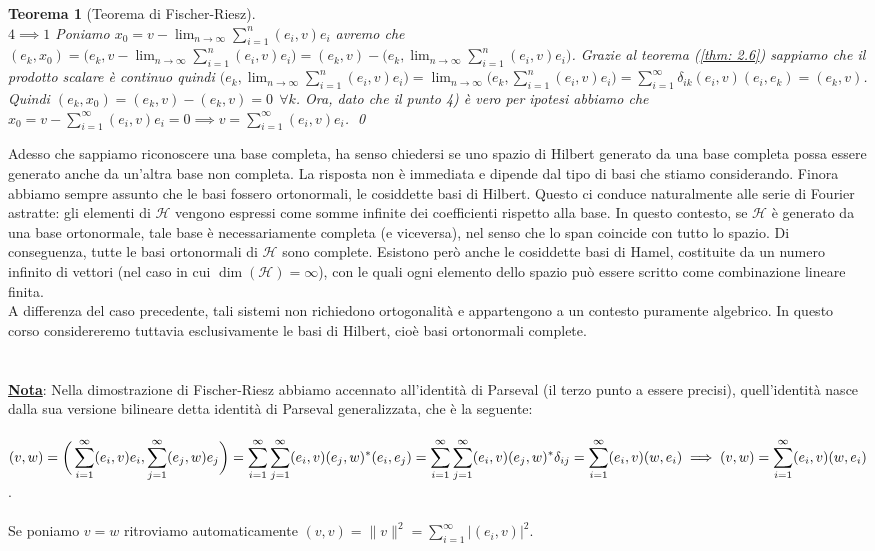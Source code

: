 \documentclass[a4paper,12pt]{report}
\newtheorem{teorema}{Teorema}[chapter]
\begin{document}
\begin{teorema}[Teorema di Fischer-Riesz]
    \\ $\boxed{4 \implies 1}$ Poniamo $x_0=v-\displaystyle\lim_{n \to\infty}\sum_{i=1}^n(e_i,v)e_i$ avremo che $(e_k,x_0)=\bigg(e_k, v-\displaystyle\lim_{n \to\infty}\sum_{i=1}^n(e_i,v)e_i\bigg)=(e_k,v)-\bigg(e_k,\lim_{n\to\infty}\sum_{i=1}^n(e_i,v)e_i\bigg)$. Grazie al teorema (\ref{thm: 2.6}) sappiamo che il prodotto scalare è continuo quindi \mbox{$\bigg(e_k, \displaystyle\lim_{n\to \infty}\sum_{i=1}^n(e_i,v)e_i\bigg)=\lim_{n\to \infty}\bigg(e_k,\sum_{i=1}^n(e_i,v)e_i\bigg)=\sum_{i=1}^{\infty}\delta_{ik}(e_i,v)(e_i,e_k)=(e_k,v)$}.
    \\Quindi $(e_k,x_0)=(e_k,v)-(e_k,v)=0 \ \ \forall k$. Ora, dato che il punto 4) è vero per ipotesi abbiamo che $x_0=v-\displaystyle\sum_{i=1}^{\infty}(e_i,v)e_i=0 \implies v=\sum_{i=1}^{\infty}(e_i,v)e_i$. \qed
\end{teorema}

Adesso che sappiamo riconoscere una base completa, ha senso chiedersi se uno spazio di Hilbert generato da una base completa possa essere generato anche da un’altra base non completa. La risposta non è immediata e dipende dal tipo di basi che stiamo considerando. Finora abbiamo sempre assunto che le basi fossero ortonormali, le cosiddette basi di Hilbert. Questo ci conduce naturalmente alle serie di Fourier astratte: gli elementi di $\mathscr{H}$ vengono espressi come somme infinite dei coefficienti rispetto alla base. In questo contesto, se $\mathscr{H}$ è generato da una base ortonormale, tale base è necessariamente completa (e viceversa), nel senso che lo span coincide con tutto lo spazio. Di conseguenza, tutte le basi ortonormali di $\mathscr{H}$ sono complete. Esistono però anche le cosiddette basi di Hamel, costituite da un numero infinito di vettori (nel caso in cui $\dim(\mathscr{H}) = \infty$), con le quali ogni elemento dello spazio può essere scritto come combinazione lineare finita.
\\A differenza del caso precedente, tali sistemi non richiedono ortogonalità e appartengono a un contesto puramente algebrico. In questo corso  considereremo tuttavia esclusivamente le basi di Hilbert, cioè basi ortonormali complete.
\\
\\
\\ \underline{\textbf{Nota}}\label{2.2.3,n}: Nella dimostrazione di Fischer-Riesz abbiamo accennato all'identità di Parseval (il terzo punto a essere precisi), quell'identità nasce dalla sua versione bilineare detta identità di Parseval generalizzata, che è la seguente:
\\
\\$(v,w)=\bigg(\displaystyle\sum_{i=1}^{\infty}(e_i,v)e_i, \sum_{j=1}^{\infty}(e_j,w)e_j\bigg)=\sum_{i=1}^{\infty}\sum_{j=1}^{\infty}(e_i,v)(e_j,w)^*(e_i,e_j)
=\sum_{i=1}^{\infty}\sum_{j=1}^{\infty}(e_i,v)(e_j,w)^*\delta_{ij}
\\=\sum_{i=1}^{\infty}(e_i,v)(w,e_i) \implies (v,w)=\sum_{i=1}^{\infty}(e_i,v)(w,e_i)$.
\\
\\ Se poniamo $v=w$ ritroviamo automaticamente $(v,v)=\|v\|^2=\displaystyle\sum_{i=1}^{\infty}|(e_i,v)|^2$.
\end{document}

